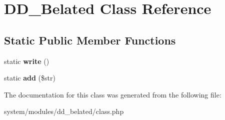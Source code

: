 \hypertarget{class_d_d___belated}{
\section{DD\_\-Belated Class Reference}
\label{class_d_d___belated}
}
\subsection*{Static Public Member Functions}
\begin{DoxyCompactItemize}
\item 
\hypertarget{class_d_d___belated_a36f1dbcdd91875b66a3933c29378c9c7}{
static {\bfseries write} ()}
\label{class_d_d___belated_a36f1dbcdd91875b66a3933c29378c9c7}

\item 
\hypertarget{class_d_d___belated_aef561fcfa7197c4bf8e0ef0fc82221a5}{
static {\bfseries add} (\$str)}
\label{class_d_d___belated_aef561fcfa7197c4bf8e0ef0fc82221a5}

\end{DoxyCompactItemize}


The documentation for this class was generated from the following file:\begin{DoxyCompactItemize}
\item 
system/modules/dd\_\-belated/class.php\end{DoxyCompactItemize}

